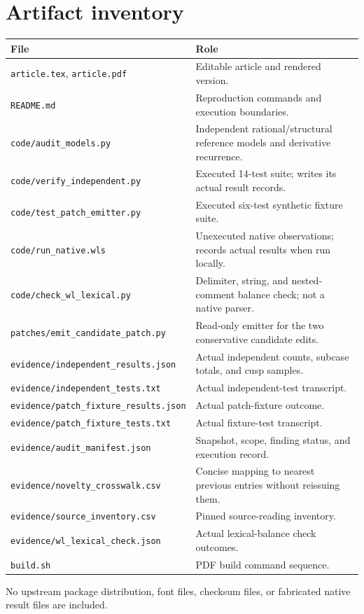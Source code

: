\documentclass[11pt,a4paper]{article}
\newcommand{\file}[1]{\nolinkurl{#1}}
\begin{document}
\section{Artifact inventory}
\begin{longtable}{@{}L{71mm}L{\dimexpr\textwidth-71mm-2\tabcolsep\relax}@{}}
\toprule File & Role\\\midrule\endhead
\file{article.tex}, \file{article.pdf} & Editable article and rendered version.\\
\file{README.md} & Reproduction commands and execution boundaries.\\
\file{code/audit_models.py} & Independent rational/structural reference models and derivative recurrence.\\
\file{code/verify_independent.py} & Executed 14-test suite; writes its actual result records.\\
\file{code/test_patch_emitter.py} & Executed six-test synthetic fixture suite.\\
\file{code/run_native.wls} & Unexecuted native observations; records actual results when run locally.\\
\file{code/check_wl_lexical.py} & Delimiter, string, and nested-comment balance check; not a native parser.\\
\file{patches/emit_candidate_patch.py} & Read-only emitter for the two conservative candidate edits.\\
\file{evidence/independent_results.json} & Actual independent counts, subcase totals, and cusp samples.\\
\file{evidence/independent_tests.txt} & Actual independent-test transcript.\\
\file{evidence/patch_fixture_results.json} & Actual patch-fixture outcome.\\
\file{evidence/patch_fixture_tests.txt} & Actual fixture-test transcript.\\
\file{evidence/audit_manifest.json} & Snapshot, scope, finding status, and execution record.\\
\file{evidence/novelty_crosswalk.csv} & Concise mapping to nearest previous entries without reissuing them.\\
\file{evidence/source_inventory.csv} & Pinned source-reading inventory.\\
\file{evidence/wl_lexical_check.json} & Actual lexical-balance check outcomes.\\
\file{build.sh} & PDF build command sequence.\\
\bottomrule
\end{longtable}
No upstream package distribution, font files, checksum files, or fabricated
native result files are included.
\end{document}
